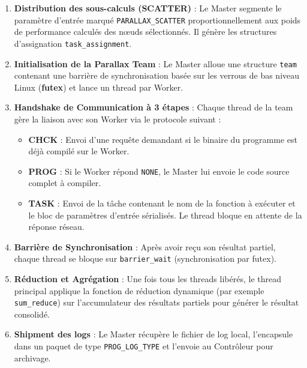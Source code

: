 \documentclass[12pt,a4paper]{report}
\begin{document}
\begin{enumerate}
\begin{itemize}
        \end{itemize}
        Les valeurs $\text{norm\_X}_i$ représentent la normalisation de la capacité par rapport au maximum observé dans le cluster : $\text{norm\_X}_i = \frac{C_X(i)}{\max_{j} C_X(j)}$. Si un nœud est marqué comme surchargé (\texttt{is\_overloaded}), son score est forcé à $0.0$.
    \item \textbf{Distribution des sous-calculs (SCATTER)} : Le Master segmente le paramètre d'entrée marqué \texttt{PARALLAX\_SCATTER} proportionnellement aux poids de performance calculés des nœuds sélectionnés. Il génère les structures d'assignation \texttt{task\_assignment}.
    \item \textbf{Initialisation de la Parallax Team} : Le Master alloue une structure \texttt{team} contenant une barrière de synchronisation basée sur les verrous de bas niveau Linux (\textbf{futex}) et lance un thread par Worker.
    \item \textbf{Handshake de Communication à 3 étapes} :
        Chaque thread de la team gère la liaison avec son Worker via le protocole suivant :
        \begin{itemize}
            \item \textbf{CHCK} : Envoi d'une requête demandant si le binaire du programme est déjà compilé sur le Worker.
            \item \textbf{PROG} : Si le Worker répond \texttt{NONE}, le Master lui envoie le code source complet à compiler.
            \item \textbf{TASK} : Envoi de la tâche contenant le nom de la fonction à exécuter et le bloc de paramètres d'entrée sérialisés. Le thread bloque en attente de la réponse réseau.
        \end{itemize}
    \item \textbf{Barrière de Synchronisation} : Après avoir reçu son résultat partiel, chaque thread se bloque sur \texttt{barrier\_wait} (synchronisation par futex).
    \item \textbf{Réduction et Agrégation} : Une fois tous les threads libérés, le thread principal applique la fonction de réduction dynamique (par exemple \texttt{sum\_reduce}) sur l'accumulateur des résultats partiels pour générer le résultat consolidé.
    \item \textbf{Shipment des logs} : Le Master récupère le fichier de log local, l'encapsule dans un paquet de type \texttt{PROG\_LOG\_TYPE} et l'envoie au Contrôleur pour archivage.
\end{enumerate}
\end{document}
